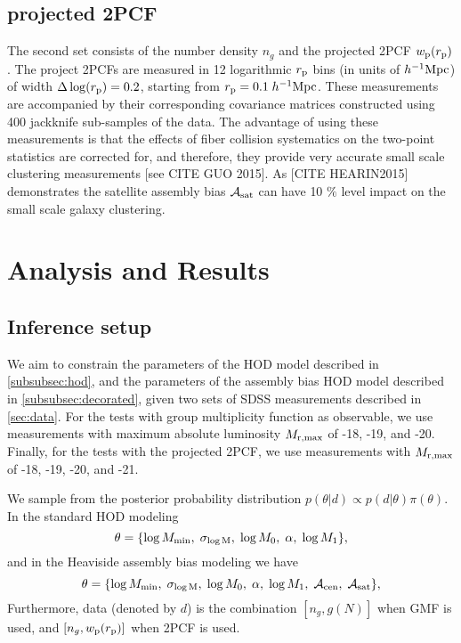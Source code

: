 \documentclass[14pt, preprint]{emulateapj}
\newcommand{\beq}{\begin{equation}}
\newcommand{\eeq}{\end{equation}}
\newcommand{\mzero}{\log M_{0}}
\newcommand{\mone}{\log M_{1}}
\newcommand{\mmin}{\log M_{\rm min}}
\newcommand{\sigmam}{\sigma_{\log \rm M}}
\newcommand{\acen}{\mathcal{A}_{\rm cen}}
\newcommand{\asat}{\mathcal{A}_{\rm sat}}
\begin{document}
\subsection{projected 2PCF}

The second set consists of the number density $n_{g}$ and the projected 2PCF $w_{\rm{p}}(r_{\rm{p}})$. The project 2PCFs are measured in 12 logarithmic $r_{\rm p}$ bins (in units of $h^{-1}\rm{Mpc}$) of width $\Delta \log(r_{\rm p}) = 0.2$, starting from $r_{\rm{p}} = 0.1 \; h^{-1}\rm{Mpc}$. These measurements are accompanied by their corresponding covariance matrices constructed using 400 jackknife sub-samples of the data. The advantage of using these measurements is that the effects of fiber collision systematics on the two-point statistics are corrected for, and therefore, they provide very accurate small scale clustering measurements [see CITE GUO 2015]. As [CITE HEARIN2015] demonstrates the satellite assembly bias $\mathcal{A}_{\rm sat}$ can have 10 $\%$ level impact on the small scale galaxy clustering.  

\section{Analysis and Results}

\subsection{Inference setup}

We aim to constrain the parameters of the HOD model described in \ref{subsubsec:hod}, and the parameters of the assembly bias HOD model described in \ref{subsubsec:decorated}, given two sets of SDSS measurements described in \ref{sec:data}. For the tests with group multiplicity function as observable, we use measurements with maximum absolute luminosity $M_{\rm r , max}$ of -18, -19, and -20. Finally, for the tests with the projected 2PCF, we use measurements with $M_{\rm r , max}$ of -18, -19, -20, and -21.  

We sample from the posterior probability distribution $p(\theta|d) \propto p(d|\theta) \pi(\theta)$. In the standard HOD modeling 
\beq
\theta = \{ \mmin, \; \sigmam, \; \mzero, \; \alpha, \; \mone \},
\eeq
and in the Heaviside assembly bias modeling we have 
\beq
\theta = \{ \mmin, \; \sigmam, \; \mzero, \; \alpha, \; \mone, \; \acen, \; \asat \},
\eeq
Furthermore, data (denoted by $d$) is the combination $[n_{g},g(N)]$ when GMF is used, and $[n_{g}, w_{\rm{p}}(r_{\rm{p}})]$ when 2PCF is used.
\end{document}
